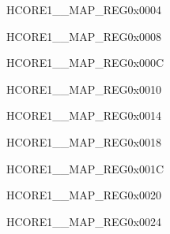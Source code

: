 \begin{register}{H}{CORE1\_\_MAP\_REG}{0x0004}\label{regdesc:CORE1LPWDTINTMAPREG}
\end{register}\vspace{-3em}


\begin{register}{H}{CORE1\_\_MAP\_REG}{0x0008}\label{regdesc:CORE1LPTIMERREG0INTMAPREG}
\end{register}\vspace{-3em}


\begin{register}{H}{CORE1\_\_MAP\_REG}{0x000C}\label{regdesc:CORE1LPTIMERREG1INTMAPREG}
\end{register}\vspace{-3em}


\begin{register}{H}{CORE1\_\_MAP\_REG}{0x0010}\label{regdesc:CORE1MBHPINTMAPREG}
\end{register}\vspace{-3em}


\begin{register}{H}{CORE1\_\_MAP\_REG}{0x0014}\label{regdesc:CORE1MBLPINTMAPREG}
\end{register}\vspace{-3em}


\begin{register}{H}{CORE1\_\_MAP\_REG}{0x0018}\label{regdesc:CORE1PMUREG0INTMAPREG}
\end{register}\vspace{-3em}


\begin{register}{H}{CORE1\_\_MAP\_REG}{0x001C}\label{regdesc:CORE1PMUREG1INTMAPREG}
\end{register}\vspace{-3em}


\begin{register}{H}{CORE1\_\_MAP\_REG}{0x0020}\label{regdesc:CORE1LPANAPERIINTMAPREG}
\end{register}\vspace{-3em}


\begin{register}{H}{CORE1\_\_MAP\_REG}{0x0024}\label{regdesc:CORE1LPADCINTMAPREG}
\end{register}\vspace{-3em}


